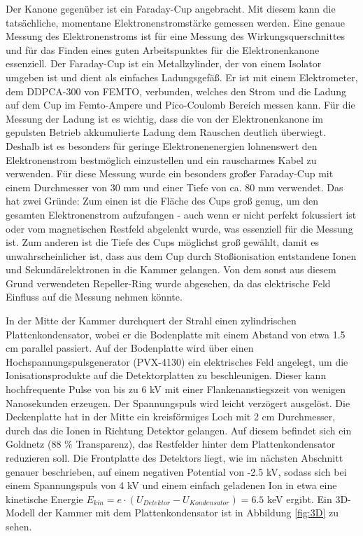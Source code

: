 Der Kanone gegenüber ist ein Faraday-Cup angebracht. Mit diesem kann die tatsächliche, momentane Elektronenstromstärke gemessen werden. Eine genaue Messung des Elektronenstroms ist für eine Messung des Wirkungsquerschnittes und für das Finden eines guten Arbeitspunktes für die Elektronenkanone essenziell. Der Faraday-Cup ist ein Metallzylinder, der von einem Isolator umgeben ist und dient als einfaches Ladungsgefäß. Er ist mit einem Elektrometer, dem DDPCA-300 von \textsc{FEMTO}, verbunden, welches den Strom und die Ladung auf dem Cup im Femto-Ampere und Pico-Coulomb Bereich messen kann. Für die Messung der Ladung ist es wichtig, dass die von der Elektronenkanone im gepulsten Betrieb akkumulierte Ladung dem Rauschen deutlich überwiegt. Deshalb ist es besonders für geringe Elektronenenergien lohnenswert den Elektronenstrom bestmöglich einzustellen und ein rauscharmes Kabel zu verwenden. Für diese Messung wurde ein besonders großer Faraday-Cup mit einem Durchmesser von 30 mm und einer Tiefe von ca. 80 mm verwendet. Das hat zwei Gründe: Zum einen ist die Fläche des Cups groß genug, um den gesamten Elektronenstrom aufzufangen - auch wenn er nicht perfekt fokussiert ist oder vom magnetischen Restfeld abgelenkt wurde, was essenziell für die Messung ist. Zum anderen ist die Tiefe des Cups möglichst groß gewählt, damit es unwahrscheinlicher ist, dass aus dem Cup durch Stoßionisation entstandene Ionen und Sekundärelektronen in die Kammer gelangen. Von dem sonst aus diesem Grund verwendeten Repeller-Ring wurde abgesehen, da das elektrische Feld Einfluss auf die Messung nehmen könnte.

In der Mitte der Kammer durchquert der Strahl einen zylindrischen Plattenkondensator, wobei er die Bodenplatte mit einem Abstand von etwa 1.5 cm parallel passiert. Auf der Bodenplatte wird über einen Hochspannungspulsgenerator (PVX-4130) ein elektrisches Feld angelegt, um die Ionisationsprodukte auf die Detektorplatten zu beschleunigen. Dieser kann hochfrequente Pulse von bis zu 6 kV mit einer Flankenanstiegszeit von wenigen Nanosekunden erzeugen. Der Spannungspuls wird leicht verzögert ausgelöst. Die Deckenplatte hat in der Mitte ein kreisförmiges Loch mit 2 cm Durchmesser, durch das die Ionen in Richtung Detektor gelangen. Auf diesem befindet sich ein Goldnetz (88 \% Transparenz), das Restfelder hinter dem Plattenkondensator reduzieren soll. Die Frontplatte des Detektors liegt, wie im nächsten Abschnitt genauer beschrieben, auf einem negativen Potential von -2.5 kV, sodass sich bei einem Spannungspuls von 4 kV und einem einfach geladenen Ion in etwa eine kinetische Energie $E_{kin} = e \cdot (U_{Detektor} - U_{Kondensator}) = 6.5$ keV ergibt. Ein 3D-Modell der Kammer mit dem Plattenkondensator ist in Abbildung \ref{fig:3D} zu sehen.

